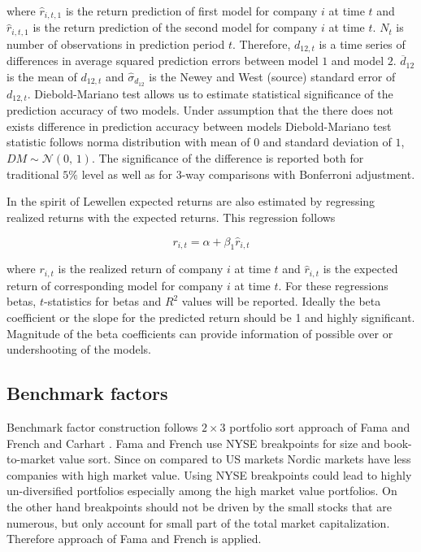 \documentclass{article}
\begin{document}
where $\hat r_{i, t, 1}$ is the return prediction of first model for company $i$ at time $t$ and $\hat r_{i, t, 1}$ is the return prediction of the second model  for company $i$ at time $t$. $N_t$ is number of observations in prediction period $t$. Therefore, $d_{12, t}$ is a time series of differences in average squared prediction errors between model $1$ and model $2$. $\overline{d}_{12}$ is the mean of $d_{12, t}$ and $\hat \sigma_{d_{12}}$ is the Newey and West (source) standard error of $d_{12, t}$. Diebold-Mariano test allows us to estimate statistical significance of the prediction accuracy of two models. Under assumption that the there does not exists difference in prediction accuracy between models Diebold-Mariano test statistic follows norma distribution with mean of $0$ and standard deviation of $1$, $DM \sim \mathcal{N}(0,\, 1)$. The significance of the difference is reported both for traditional $5\%$ level as well as for 3-way comparisons with Bonferroni adjustment.

In the spirit of Lewellen \citeyear{lewellen2015} expected returns are also estimated by regressing realized returns with the expected returns. This regression follows

\begin{equation}
\label{eq:realizedRegression}
r_{i, t} = \alpha + \beta_1 \hat r_{i, t}
\end{equation}

where $r_{i, t}$ is the realized return of company $i$ at time $t$ and $\hat r_{i, t}$ is the expected return of corresponding model for company $i$ at time $t$. For these regressions betas, $t$-statistics for betas and $R^2$ values will be reported. Ideally the beta coefficient or the slope for the predicted return should be 1 and highly significant. Magnitude of the beta coefficients can provide information of possible over or undershooting of the models.

\subsection{Benchmark factors}\label{BenchmarkFactors}
Benchmark factor construction follows $2 \times 3$ portfolio sort approach of Fama and French \citeyear{FAMA19933, FAMA20151} and Carhart \citeyear{Carhart1997}. Fama and French \citeyear{FAMA19933} use NYSE breakpoints for size and book-to-market value sort. Since on compared to US markets Nordic markets have less companies with high market value. Using NYSE breakpoints could lead to highly un-diversified portfolios especially among the high market value portfolios. On the other hand breakpoints should not be driven by the small stocks that are numerous, but only account for small part of the total market capitalization. Therefore approach of Fama and French \citeyear{FAMA2012457} is applied. 
\end{document}
